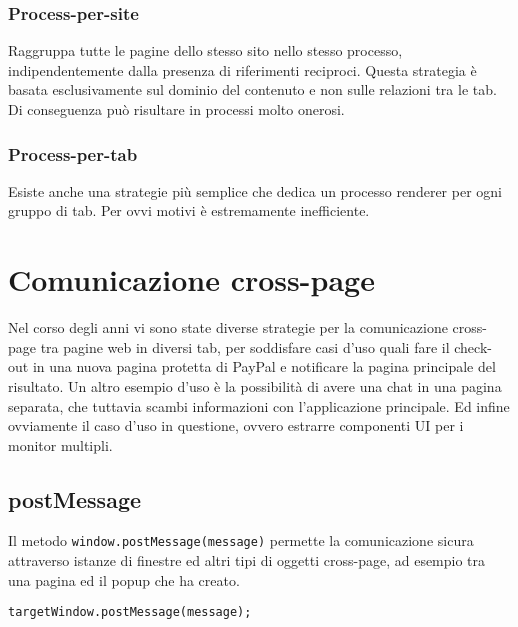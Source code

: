 \subsubsection{Process-per-site}

Raggruppa tutte le pagine dello stesso sito nello stesso processo, indipendentemente dalla presenza di riferimenti reciproci. Questa strategia è basata esclusivamente sul dominio del contenuto e non sulle relazioni tra le tab. Di conseguenza può risultare in processi molto onerosi.

\subsubsection{Process-per-tab}

Esiste anche una strategie più semplice che dedica un processo renderer per ogni gruppo di tab. Per ovvi motivi è estremamente inefficiente.

\section{Comunicazione cross-page}

Nel corso degli anni vi sono state diverse strategie per la comunicazione cross-page tra pagine web in diversi tab, per soddisfare casi d'uso quali fare il check-out in una nuova pagina protetta di PayPal e notificare la pagina principale del risultato. Un altro esempio d'uso è la possibilità di avere una chat in una pagina separata, che tuttavia scambi informazioni con l'applicazione principale. Ed infine ovviamente il caso d'uso in questione, ovvero estrarre componenti UI per i monitor multipli. \\

\subsection{postMessage}

Il metodo \texttt{window.postMessage(message)} permette la comunicazione sicura attraverso istanze di finestre ed altri tipi di oggetti cross-page, ad esempio tra una pagina ed il popup che ha creato.

\texttt{targetWindow.postMessage(message);}


